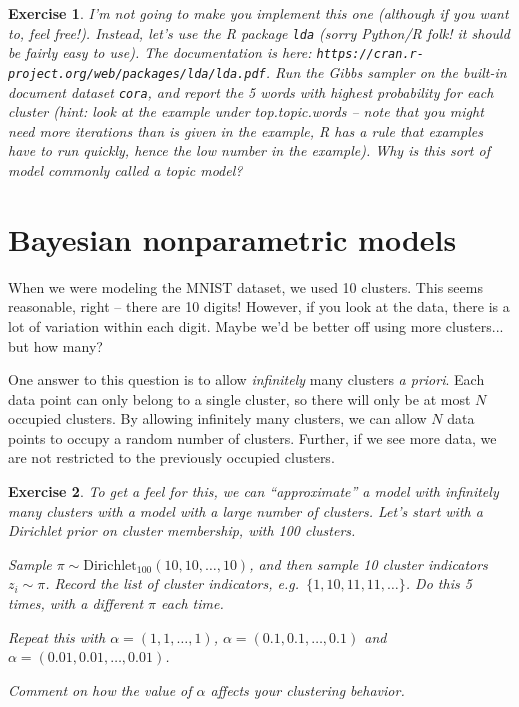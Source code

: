 \documentclass[twoside]{article}
\newcounter{lecnum}
\newtheorem{exercise}{Exercise}[lecnum]
\begin{document}
 \begin{exercise}
   I'm not going to make you implement this one (although if you want to, feel free!). Instead, let's use the R package \texttt{lda} (sorry Python/R folk! it should be fairly easy to use). The documentation is here: \texttt{https://cran.r-project.org/web/packages/lda/lda.pdf}. Run the Gibbs sampler on the built-in document dataset \texttt{cora}, and report the 5 words with highest probability for each cluster (hint: look at the example under top.topic.words -- note that you might need more iterations than is given in the example, R has a rule that examples have to run quickly, hence the low number in the example). Why is this sort of model commonly called a topic model?
 \end{exercise}
 


 \section{Bayesian nonparametric models}

 When we were modeling the MNIST dataset, we used 10 clusters. This seems reasonable, right -- there are 10 digits! However, if you look at the data, there is a lot of variation within each digit. Maybe we'd be better off using more clusters... but how many?

 One answer to this question is to allow \textit{infinitely} many clusters \textit{a priori}. Each data point can only belong to a single cluster, so there will only be at most $N$ occupied clusters. By allowing infinitely many clusters, we can allow $N$ data points to occupy a random number of clusters. Further, if we see more data, we are not restricted to the previously occupied clusters.

 \begin{exercise}

   To get a feel for this, we can ``approximate'' a model with infinitely many clusters with a model with a large number of clusters. Let's start with a Dirichlet prior on cluster membership, with 100 clusters.

   Sample $\pi\sim \mbox{Dirichlet}_{100}(10,10,\dots,10)$, and then sample 10 cluster indicators $z_i\sim \pi$. Record the list of cluster indicators, e.g.\ $\{1,10,11,11,\dots\}$. Do this 5 times, with a different $\pi$ each time.

   Repeat this with $\alpha = (1,1,\dots,1)$, $\alpha = (0.1,0.1,\dots,0.1)$ and $\alpha=(0.01,0.01,\dots,0.01)$.

   Comment on how the value of $\alpha$ affects your clustering behavior.
 \end{exercise}
\end{document}
